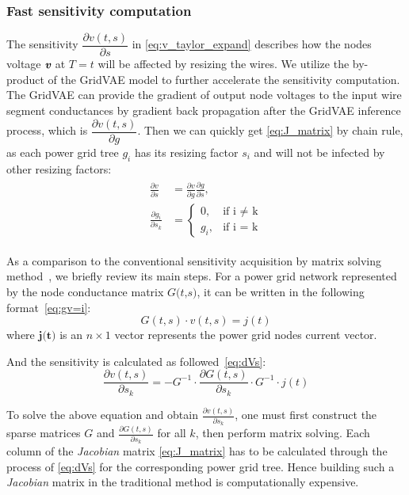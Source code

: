 \subsubsection{Fast sensitivity computation}

The sensitivity $ \dfrac{\partial v(t, s)}{\partial s}$ in  \eqref{eq:v_taylor_expand} describes how the nodes voltage $\textit{\textbf{v}}$ at $\textit{T}= t$ will be affected by resizing the wires. We utilize the by-product of the GridVAE model to further accelerate the sensitivity computation. The GridVAE can provide the gradient of output node voltages to the input wire segment conductances by gradient back propagation after the GridVAE inference process, which is $ \dfrac{\partial v(t, s)}{\partial g}$. Then we can quickly get \eqref{eq:J_matrix} by chain rule, as each power grid tree $g_{i}$ has its resizing factor $s_{i}$ and will not be infected by other resizing factors:
\begin{equation}
	\label{eq:chain_rule}
	\begin{aligned}
	\begin{split}
	\frac{\partial v}{\partial s} & =\frac{\partial v}{\partial g} \frac{\partial g}{\partial s}, \\ 
	\frac{\partial g_{i}}{\partial s_{k}} & = 
    	\begin{cases}
        		0,      &\mbox{if i $\neq$ k} \\ 
        		g_{i},  &\mbox{if i = k} 
    	\end{cases}
	\end{split}
	\end{aligned}
\end{equation}

As a comparison to the conventional sensitivity acquisition by matrix solving method~\cite{Sukharev:2019pg}, we briefly review its main steps.
For a power grid network represented by the node conductance matrix $ \textit{G(t,s)}$, it can be written in the following format~\eqref{eq:gv=i}:
\begin{equation}
	\label{eq:gv=i}
	G(t,s)\cdot v(t,s)= j(t)
\end{equation}
where $\textbf{j(t)}$  is an $n\times 1$ vector represents the power grid nodes current vector.

And the sensitivity is calculated as followed~\eqref{eq:dVs}: 
\begin{equation}
	\label{eq:dVs}
	\dfrac{\partial v(t,s)}{\partial s_{k}} = -G^{-1}\cdot \dfrac{\partial G(t,s)}{\partial s_{k}}  \cdot G^{-1}\cdot j(t)
\end{equation}

To solve the above equation and obtain $ \frac{\partial v(t,s)}{\partial s_{k}}$, one must first construct the sparse matrices $\textit{G}$ and $\frac{\partial G(t,s)}{\partial s_{k}}$ for all $k$, then perform matrix solving. 
Each column of the \textit{Jacobian} matrix \eqref{eq:J_matrix} has to be calculated through the process of \eqref{eq:dVs} for the corresponding power grid tree. Hence building such a \textit{Jacobian} matrix in the traditional method is computationally expensive.










